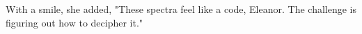 
With a smile, she added, "These spectra feel like a code, Eleanor. The challenge is figuring out how to decipher it."









